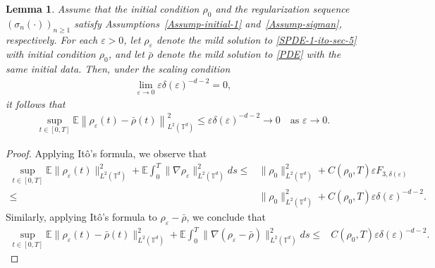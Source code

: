 \documentclass[UTF-8,reqno]{amsart}
\numberwithin{equation}{section}
\newtheorem{lemma}[theorem]{Lemma}
\def\geq{\geqslant}
\def\leq{\leqslant}
\def\geq{\geqslant}
\def\leq{\leqslant}
\begin{document}
\begin{lemma}\label{lem-LLN-regular}
Assume that the initial condition $\rho_0$ and the regularization sequence $(\sigma_n(\cdot))_{n \geq 1}$ satisfy Assumptions~\ref{Assump-initial-1} and~\ref{Assump-sigman}, respectively. For each $\varepsilon > 0$, let $\rho_{\varepsilon}$ denote the mild solution to \eqref{SPDE-1-ito-sec-5} with initial condition $\rho_0$, and let $\bar{\rho}$ denote the mild solution to \eqref{PDE} with the same initial data. Then, under the scaling condition
\begin{align*}
\lim_{\varepsilon \to 0} \varepsilon \delta(\varepsilon)^{-d-2} = 0,
\end{align*}
it follows that
\begin{align*}
\sup_{t\in[0,T]}\mathbb{E} \left\| \rho_{\varepsilon}(t) - \bar{\rho}(t) \right\|_{L^2(\mathbb{T}^d)}^2 
\leq \varepsilon \delta(\varepsilon)^{-d-2} 
\longrightarrow 0 \quad \text{as } \varepsilon \to 0.
\end{align*}
\end{lemma}
\begin{proof}
Applying It\^o's formula, we observe that 
\begin{align*}
\sup_{t\in[0,T]}\mathbb{E}\|\rho_{\varepsilon}(t)\|_{L^2(\mathbb{T}^d)}^2+\mathbb{E}\int^T_0\|\nabla\rho_{\varepsilon}\|_{L^2(\mathbb{T}^d)}^2ds\leq& \|\rho_0\|_{L^2(\mathbb{T}^d)}^2+C(\rho_0,T)\varepsilon F_{3,\delta(\varepsilon)}\\
\leq&\|\rho_0\|_{L^2(\mathbb{T}^d)}^2+C(\rho_0,T)\varepsilon \delta(\varepsilon)^{-d-2}. 	
\end{align*}
Similarly, applying It\^o's formula to $\rho_{\varepsilon}-\bar{\rho}$, we conclude that 
\begin{align*}
	\sup_{t\in[0,T]}\mathbb{E}\|\rho_{\varepsilon}(t)-\bar{\rho}(t)\|_{L^2(\mathbb{T}^d)}^2+\mathbb{E}\int^T_0\|\nabla(\rho_{\varepsilon}-\bar{\rho})\|_{L^2(\mathbb{T}^d)}^2ds\leq&C(\rho_0,T)\varepsilon \delta(\varepsilon)^{-d-2}.
\end{align*}


\end{proof}
\end{document}
